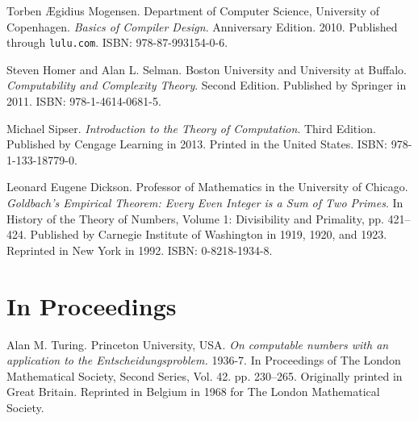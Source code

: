 \begin{thebibliography}{9}
\backrefprint


Torben Ægidius Mogensen. Department of Computer Science, University of
Copenhagen. \emph{Basics of Compiler Design}. Anniversary Edition. 2010.
Published through \texttt{lulu.com}. ISBN: 978-87-993154-0-6.

\backrefprint





Steven Homer and Alan L. Selman. Boston University and University at Buffalo.
\emph{Computability and Complexity Theory}. Second Edition. Published by
Springer in 2011. ISBN: 978-1-4614-0681-5.

\backrefprint


Michael Sipser. \emph{Introduction to the Theory of Computation}. Third
Edition. Published by Cengage Learning in 2013. Printed in the United States.
ISBN: 978-1-133-18779-0.

\backrefprint




Leonard Eugene Dickson. Professor of Mathematics in the University of Chicago.
\emph{Goldbach's Empirical Theorem: Every Even Integer is a Sum of Two Primes}.
In History of the Theory of Numbers, Volume 1: Divisibility and Primality, pp.
421--424.  Published by Carnegie Institute of Washington in 1919, 1920, and
1923.  Reprinted in New York in 1992. ISBN: 0-8218-1934-8.

\backrefprint

\section*{In Proceedings}


Alan M. Turing. Princeton University, USA. \emph{On computable numbers with an
application to the Entscheidungsproblem.} 1936-7. In Proceedings of The London
Mathematical Society, Second Series, Vol. 42. pp. 230–265. Originally printed
in Great Britain. Reprinted in Belgium in 1968 for The London Mathematical
Society.


\end{thebibliography}
